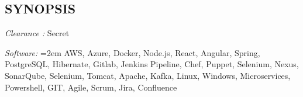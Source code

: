 \documentclass[12pt, line, margin]{res}
\begin{document}

\address{
}

\begin{resume}


\section{SYNOPSIS} {\sl Clearance :} Secret

               {\sl Software:}  
			\hangindent=2em
			AWS, Azure, Docker, Node.js, React, Angular, Spring,\newline 
			PostgreSQL, Hibernate, Gitlab, Jenkins Pipeline, Chef, Puppet,\newline
			Selenium, Nexus, SonarQube, Selenium, Tomcat, Apache, Kafka,\newline
			Linux, Windows, Microservices, Powershell, GIT, Agile, Scrum,\newline
			Jira, Confluence\newline


\end{resume}
\end{document}

